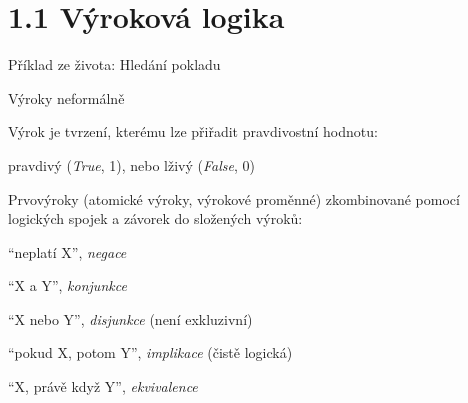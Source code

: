 \documentclass{beamer}
\begin{document}
\section{1.1 Výroková logika}


\begin{frame}{Příklad ze života: Hledání pokladu}


\end{frame}


\begin{frame}{Výroky neformálně}

    \alert{Výrok} je tvrzení, kterému lze přiřadit pravdivostní hodnotu: 
    \begin{center}
        \alert{pravdivý} (\emph{True}, 1), nebo \alert{lživý} (\emph{False}, 0)
    \end{center}
    
    \alert{Prvovýroky} (\alert{atomické výroky}, \alert{výrokové proměnné}) zkombinované pomocí logických spojek a závorek do \alert{složených výroků}:


    \begin{description}\setlength{\itemsep}{3pt}
        \item[\huge\alert{$\neg$}] ``neplatí X'', \emph{negace}
        \item[\huge\alert{$\landsymb$}] ``X a Y'', \emph{konjunkce}
        \item[\huge\alert{$\lorsymb$}] ``X nebo Y'', \emph{disjunkce} (není exkluzivní)
        \item[\huge\alert{$\limpliessymb$}] ``pokud X, potom Y'', \emph{implikace} (čistě logická)
        \item[\huge\alert{$\liffsymb$}] ``X, právě když Y'', \emph{ekvivalence}
    \end{description}

\end{frame}
\end{document}
